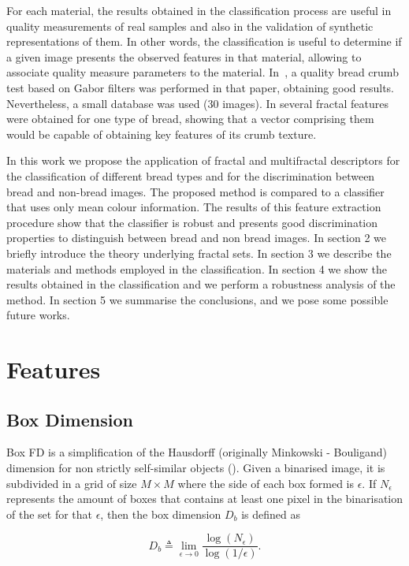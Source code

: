 \documentclass[oneside,a4paper,english,links]{amca}
\begin{document}
For each material, the results obtained in the classification process are useful in quality measurements of real samples and also in the validation of synthetic representations of them. In other words, the classification is useful to determine if a given image presents the observed features in that material, allowing to associate quality measure parameters to the material. In~\cite{Fan2006}, a quality bread crumb test based on Gabor filters was performed in that paper, obtaining good results. Nevertheless, a small database was used ($30$ images). In \cite{Gonzales2008} several fractal features were obtained for one type of bread, showing that a vector comprising them would be capable of obtaining key features of its crumb texture.

In this work we propose the application of fractal and multifractal descriptors for the classification of different bread types and for the discrimination between bread and non-bread images. The proposed method is compared to a classifier that uses only mean colour information. The results of this feature extraction procedure show that the classifier is robust and presents good discrimination properties to distinguish between bread and non bread images. In section 2 we briefly introduce the theory underlying fractal sets. In section 3 we describe the materials and methods employed in the classification. In section 4 we show the results obtained in the classification and we perform a robustness analysis of the method. In section 5 we summarise the conclusions, and we pose some possible future works.

\section{Features}
\subsection{Box Dimension}
Box FD is a simplification of the Hausdorff (originally Minkowski - Bouligand) dimension for non strictly self-similar objects (\cite{Peitgen2004}). Given a binarised image, it is subdivided in a grid of size $M\times M$ where the side of each box formed is $\epsilon$. If $N_{\epsilon}$ represents the amount of boxes that contains at least one pixel in the binarisation of the set for that $\epsilon$, then the box dimension  $D_{b}$ is defined as

\begin{equation}
D_{b} \triangleq \displaystyle\lim_{\epsilon \to 0}{\frac{\log(N_{\epsilon})}{\log (1/\epsilon)}}.
\label{eqn:eqn1}
\end{equation}
\end{document}
